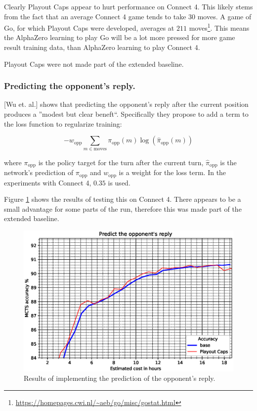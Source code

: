 \documentclass[12pt,onecolumn,oneside,titlepage]{article}
\begin{document}
Clearly Playout Caps appear to hurt performance on Connect 4. This likely stems from the fact that an average Connect 4 game tends to take $30$ moves. A game of Go, for which Playout Caps were developed, averages at $211$ moves\footnote{\url{https://homepages.cwi.nl/~aeb/go/misc/gostat.html}}.
This means the AlphaZero learning to play Go will be a lot more pressed for more game result training data, than AlphaZero learning to play Connect 4.

Playout Caps were not made part of the extended baseline.

\subsubsection{Predicting the opponent's reply.}

\cite{wu2019accelerating}[Wu et. al.] shows that predicting the opponent's reply after the current position produces a ''modest but clear beneft``.
Specifically they propose to add a term to the loss function to regularize training:

\begin{equation}
 -w_{\text{opp}} \sum\limits_{m \in \text{moves}} \pi_{\text{opp}}(m) \log(\hat{\pi}_{\text{opp}}(m)) \label{eq:opp_reply}
\end{equation}

where $\pi_{\text{opp}}$ is the policy target for the turn after the current turn, $\hat{\pi}_{\text{opp}}$ is the network's prediction of $\pi_{\text{opp}}$ and $w_{\text{opp}}$ is a weight for the loss term. In the experiments with Connect 4, $0.35$ is used.

Figure \ref{fig:predict_reply} shows the results of testing this on Connect 4. There appears to be a small advantage for some parts of the run, therefore this was made part of the extended baseline.

\begin{figure}[H]
\centering
\includegraphics[clip,width=\columnwidth]{predict_reply}
\caption{Results of implementing the prediction of the opponent's reply.}
\label{fig:predict_reply}
\end{figure}
\end{document}
